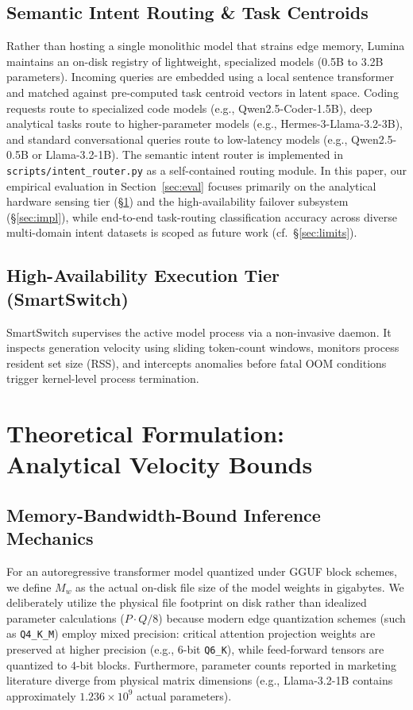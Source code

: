 \documentclass[11pt,a4paper]{article}
\newcommand{\Mw}{M_w}
\newcommand{\code}[1]{\texttt{#1}}
\begin{document}
\subsection{Semantic Intent Routing \& Task Centroids}
Rather than hosting a single monolithic model that strains edge memory, Lumina maintains an on-disk registry of lightweight, specialized models (0.5B to 3.2B parameters). Incoming queries are embedded using a local sentence transformer and matched against pre-computed task centroid vectors in latent space. Coding requests route to specialized code models (e.g., Qwen2.5-Coder-1.5B), deep analytical tasks route to higher-parameter models (e.g., Hermes-3-Llama-3.2-3B), and standard conversational queries route to low-latency models (e.g., Qwen2.5-0.5B or Llama-3.2-1B). The semantic intent router is implemented in \code{scripts/intent\_router.py} as a self-contained routing module. In this paper, our empirical evaluation in Section~\ref{sec:eval} focuses primarily on the analytical hardware sensing tier (\S\ref{sec:theory}) and the high-availability failover subsystem (\S\ref{sec:impl}), while end-to-end task-routing classification accuracy across diverse multi-domain intent datasets is scoped as future work (cf.\ \S\ref{sec:limits}).

\subsection{High-Availability Execution Tier (SmartSwitch)}
SmartSwitch supervises the active model process via a non-invasive daemon. It inspects generation velocity using sliding token-count windows, monitors process resident set size (RSS), and intercepts anomalies before fatal OOM conditions trigger kernel-level process termination.

\section{Theoretical Formulation: Analytical Velocity Bounds}\label{sec:theory}

\subsection{Memory-Bandwidth-Bound Inference Mechanics}
For an autoregressive transformer model quantized under GGUF block schemes, we define $\Mw$ as the actual on-disk file size of the model weights in gigabytes. We deliberately utilize the physical file footprint on disk rather than idealized parameter calculations ($P \cdot Q / 8$) because modern edge quantization schemes (such as \code{Q4\_K\_M}) employ mixed precision: critical attention projection weights are preserved at higher precision (e.g., 6-bit \code{Q6\_K}), while feed-forward tensors are quantized to 4-bit blocks. Furthermore, parameter counts reported in marketing literature diverge from physical matrix dimensions (e.g., Llama-3.2-1B contains approximately $1.236 \times 10^9$ actual parameters).
\end{document}
